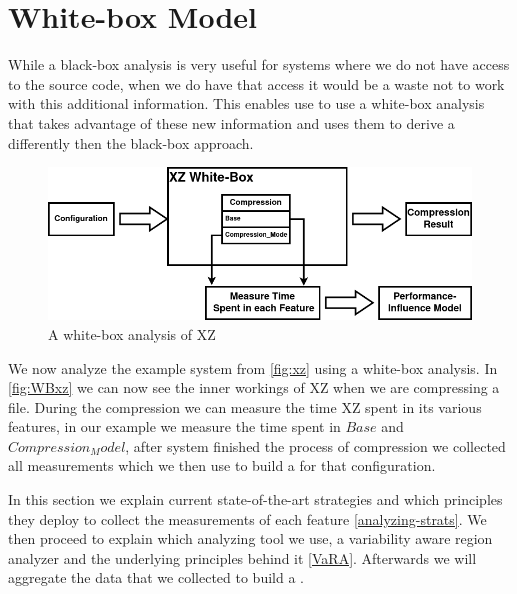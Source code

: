 

\section{White-box Model}\label{ch:Whitebox}

While a black-box analysis is very useful for systems where we do not have access to the source code, when we do have that access
it would be a waste not to work with this additional information. This enables use to use a white-box analysis 
that takes advantage of these new information and uses them to derive a \perfInfluenceModel differently then the black-box approach.


\begin{figure}[h]
    \centering
    \includegraphics[scale=0.6]{gfx/whitebox_2.png}
    \caption{A white-box analysis of XZ}
    \label{fig:WBxz}
\end{figure}

We now analyze the example system from \autoref{fig:xz} using a white-box analysis. In \autoref{fig:WBxz} we can now see the inner workings of 
XZ when we are compressing a file. During the compression we can measure the time XZ spent in its various features, in our example we measure 
the time spent in $Base$ and $Compression_Model$, after system finished the process of compression we collected all measurements which we 
then use to build a \perfInfluenceModel for that configuration.

In this section we explain current state-of-the-art strategies and which principles they deploy to collect the measurements of each feature 
\ref{analyzing-strats}. We then proceed to explain which analyzing tool we use, a variability aware region analyzer and the underlying principles
behind it \ref{VaRA}. Afterwards we will aggregate the data that we collected to build a \perfInfluenceModel. %



